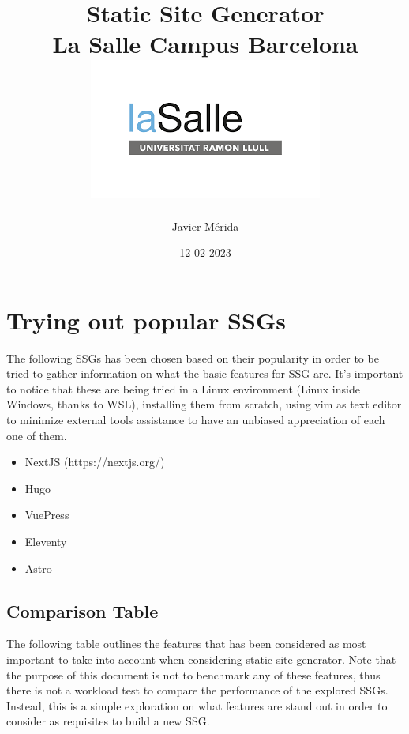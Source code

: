 \documentclass[12pt]{report}
\title{
        {Static Site Generator}\\
    {\large La Salle Campus Barcelona}\\
    {\includegraphics{lasalle-logo}}
}
\author{Javier Mérida}
\date{12 02 2023}
\begin{document}
    \maketitle


    \chapter{Trying out popular SSGs}\label{ch:trying-out-popular-ssgs}

    The following SSGs has been chosen based on their popularity in order
    to be tried to gather information on what the basic features for SSG
    are.
    It's important to notice that these are being tried in a Linux environment
    (Linux inside Windows, thanks to WSL), installing them from scratch, using vim
    as text editor to minimize external tools assistance to have an unbiased appreciation
    of each one of them.

    \begin{itemize}
        \item NextJS (https://nextjs.org/)
        \item Hugo
        \item VuePress
        \item Eleventy
        \item Astro
    \end{itemize}







    \section{Comparison Table}\label{sec:comparison-table}


    The following table outlines the features that has been considered as most important to take into account when
    considering static site generator.
    Note that the purpose of this document is not to benchmark any of these features,
    thus there is not a workload test to compare the performance of the explored SSGs. Instead, this is a simple
    exploration on what features are stand out in order to consider as requisites to build a new SSG.
\end{document}
